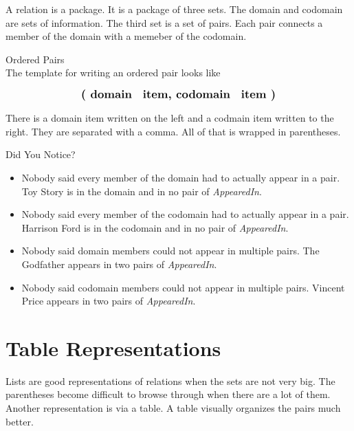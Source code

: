 \documentclass{ximera}
\begin{document}
A relation is a package.  It is a package of three sets. The domain and codomain are sets of information.  The third set is a set of pairs.  Each pair connects a member of the domain with a memeber of the codomain. 


\begin{template} Ordered Pairs \\
The template for writing an ordered pair looks like  

\[
\large{\textbf{( domain \, item, codomain \, item )}}
\]
\end{template}

There is a domain item written on the left and a codmain item written to the right.  They are separated with a comma.  All of that is wrapped in parentheses.


\begin{warning} Did You Notice? \\
\begin{itemize}
\item Nobody said every member of the domain had to actually appear in a pair.  Toy Story is in the domain and in no pair of \textit{AppearedIn}.
\item Nobody said every member of the codomain had to actually appear in a pair.  Harrison Ford is in the codomain and in no pair of \textit{AppearedIn}.
\item Nobody said domain members could not appear in multiple pairs.  The Godfather appears in two pairs of \textit{AppearedIn}.
\item Nobody said codomain members could not appear in multiple pairs.  Vincent Price appears in two pairs of \textit{AppearedIn}.
\end{itemize}
\end{warning}
















\section{Table Representations}



Lists are good representations of relations when the sets are not very big. The parentheses become difficult to browse through when there are a lot of them. Another representation is via a table. A table visually organizes the pairs much better.
\end{document}
